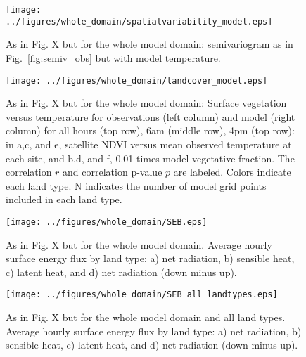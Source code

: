 \documentclass[draft,linenumbers]{agujournal}
\begin{document}
\begin{figure}[h]
\centering
\texttt{[image: ../figures/whole\_domain/spatialvariability\_model.eps]}
\caption{As in Fig. X but for the whole model domain: semivariogram as in Fig.~\ref{fig:semiv_obs} but with model temperature.}
\label{fig:semiv_model_wd}
\end{figure}

\begin{figure}[h]
\centering
\texttt{[image: ../figures/whole\_domain/landcover\_model.eps]}
\caption{As in Fig. X but for the whole model domain:  Surface vegetation versus temperature for observations (left column) and model (right column) for all hours (top row), 6am (middle row), 4pm (top row): in a,c, and e, satellite NDVI versus mean observed temperature at each site, and b,d, and f, 0.01 times model vegetative fraction. The correlation $r$ and correlation p-value $p$ are labeled. Colors indicate each land type. N indicates the number of model grid points included in each land type.}
\label{fig:veg_wd}
\end{figure}

\begin{figure}[h]
\centering
\texttt{[image: ../figures/whole\_domain/SEB.eps]}
\caption{As in Fig. X but for the whole model domain. Average hourly surface energy flux by land type: a) net radiation, b) sensible heat, c) latent heat, and d) net radiation (down minus up).}
\label{fig:seb_wd}
\end{figure}

\begin{figure}[h]
\centering
\texttt{[image: ../figures/whole\_domain/SEB\_all\_landtypes.eps]}
\caption{As in Fig. X but for the whole model domain and all land types. Average hourly surface energy flux by land type: a) net radiation, b) sensible heat, c) latent heat, and d) net radiation (down minus up).}
\label{fig:seb_wd}
\end{figure}
\end{document}
